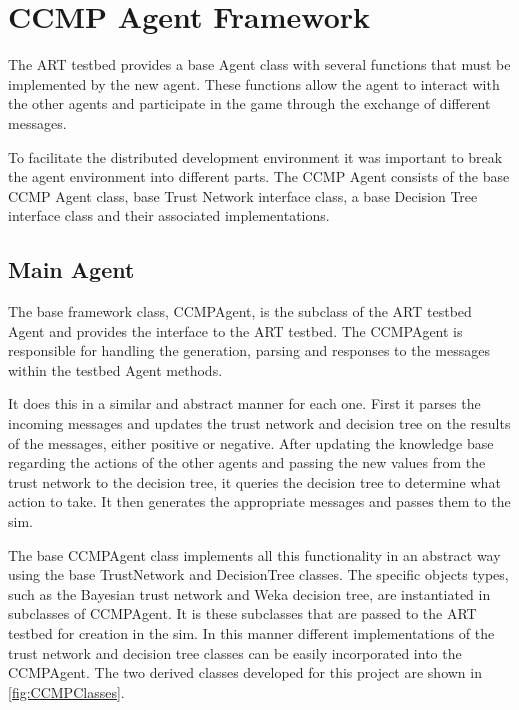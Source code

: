 \section{CCMP Agent Framework}
The ART testbed provides a base Agent class with several functions that must be
implemented by the new agent. These functions allow the agent to interact with
the other agents and participate in the game through the exchange of different
messages.  

To facilitate the distributed development environment it was important to break
the agent environment into different parts.  The CCMP Agent consists of the
base CCMP Agent class, base Trust Network interface class, a base Decision
Tree interface class and their associated implementations.

\subsection{Main Agent}
The base framework class, CCMPAgent, is the subclass of the ART testbed Agent
and provides the interface to the ART testbed.  The CCMPAgent is
responsible for handling the generation, parsing and responses to the
messages within the testbed Agent methods.  

It does this in a similar and abstract manner for each one. First it parses the
incoming messages and updates the trust network and decision tree on the
results of the messages, either positive or negative.  After updating the
knowledge base regarding the actions of the other agents and passing the new
values from the trust network to the decision tree, it queries the decision tree
to determine what action to take.  It then generates the appropriate
messages and passes them to the sim.

The base CCMPAgent class implements all this functionality in an abstract way
using the base TrustNetwork and DecisionTree classes.  The specific objects
types, such as the Bayesian trust network and Weka decision tree, are
instantiated in subclasses of CCMPAgent.  It is these subclasses that are passed
to the ART testbed for creation in the sim.  In this manner different
implementations of the trust network and decision tree classes can be easily
incorporated into the CCMPAgent.  The two derived classes developed for this 
project are shown in \ref{fig:CCMPClasses}.

